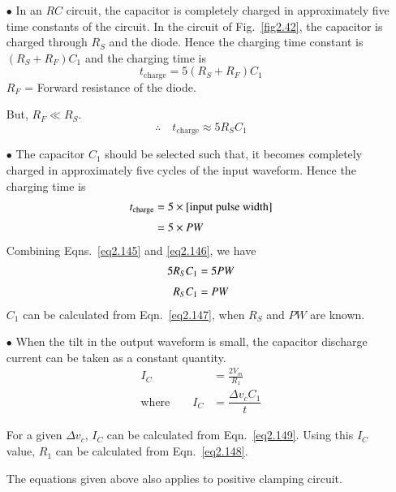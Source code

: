 \begin{itemize}
\item[$\bullet$] In an $RC$ circuit, the capacitor is completely charged in approximately five time constants of the circuit. In the circuit of Fig.~\ref{fig2.42}, the capacitor is charged through $R_{S}$ and the diode. Hence the charging time constant is $(R_{S}+R_{F})C_{1}$ and the charging time is
\begin{equation}
t_{\text{charge}}=5(R_{S}+R_{F})C_{1}\label{eq2.144}
\end{equation}
$R_{F}$ =  Forward resistance of the diode.

But, $R_{F}\ll R_{S}$.
\begin{equation}
\therefore\quad t_{\text{charge}}\approx 5R_{S}C_{1}\label{eq2.145}
\end{equation}

\item[$\bullet$] The capacitor $C_{1}$ should be selected such that, it becomes completely charged in approximately five cycles of the input waveform. Hence the charging time is
\begin{align}
t_{\text{charge}} &= 5\times [\text{input pulse width}]\notag\\[3pt]
&= 5\times PW\label{eq2.146}
\end{align}
Combining Eqns.~\eqref{eq2.145} and \eqref{eq2.146}, we have
\begin{align}
5R_{S}C_{1} &= 5PW\notag\\[3pt]
R_{S}C_{1} &= PW\label{eq2.147}
\end{align}
$C_{1}$ can be calculated from Eqn.~\eqref{eq2.147}, when $R_{S}$ and $PW$ are known.

\item[$\bullet$] When the tilt in the output waveform is small, the capacitor discharge current can be taken as a constant quantity.
\begin{align}
I_{C} &= \frac{2V_{m}}{R_{1}}\label{eq2.148}\\[3pt]
\text{where}\qquad I_{C} &= \dfrac{\Delta v_{c}C_{1}}{t}\label{eq2.149}
\end{align}

For a given $\Delta v_{c}$, $I_{C}$ can be calculated from Eqn.~\eqref{eq2.149}. Using this $I_{C}$ value, $R_{1}$ can be calculated from Eqn.~\eqref{eq2.148}.

The equations given above also applies to positive clamping circuit.
\end{itemize}

